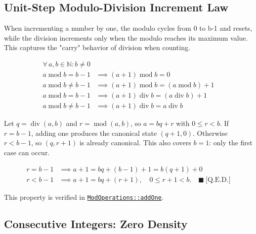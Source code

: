 \subsection{Unit-Step Modulo-Division Increment Law}
\label{sec:unit-step}

When incrementing a number by one, the modulo cycles from 0 to b-1 and
resets, while the division increments only when the modulo reaches its
maximum value. This captures the "carry" behavior of division when counting.

\begin{equation*}
\begin{aligned}
\forall\, a, b \in \mathbb{N} : b \neq 0 \\
a \operatorname{mod} b = b - 1
  &\implies (a + 1) \operatorname{mod} b = 0 \\
a \operatorname{mod} b \neq b - 1
  &\implies (a + 1) \operatorname{mod} b = (a \operatorname{mod} b) + 1 \\
a \operatorname{mod} b = b - 1
  &\implies (a + 1) \operatorname{div} b = (a \operatorname{div} b) + 1 \\
a \operatorname{mod} b \neq b - 1
  &\implies (a + 1) \operatorname{div} b = a \operatorname{div} b
\end{aligned}
\end{equation*}

Let $q=\operatorname{div}(a,b)$ and $r=\operatorname{mod}(a,b)$, so
$a=bq+r$ with $0\leq r<b$. If $r=b-1$, adding one produces the canonical
state $(q+1,0)$. Otherwise $r<b-1$, so $(q,r+1)$ is already canonical. This
also covers $b=1$: only the first case can occur.

\begin{equation*}
\begin{aligned}
r=b-1 &\implies a+1=bq+(b-1)+1=b(q+1)+0 \\
r<b-1 &\implies a+1=bq+(r+1),\quad 0\leq r+1<b.
  \quad \blacksquare\ \text{[Q.E.D.]}
\end{aligned}
\end{equation*}

This property is verified in
\href{https://github.com/thiagomata/prime-numbers/blob/modulo-article-v1.0.0/src/main/scala/v1/chapter2/div/properties/ModOperations.scala#addOne}{\texttt{ModOperations::addOne}}.

\subsection{Consecutive Integers: Zero Density}
\label{sec:zero-density}

